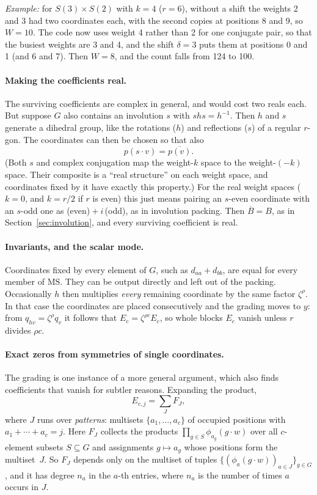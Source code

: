 \documentclass[11pt]{article}
\theoremstyle{definition}
\theoremstyle{remark}
\newcommand{\MS}{\mathrm{MS}}
\begin{document}
\emph{Example:} for $S(3)\times S(2)$ with $k = 4$ ($r = 6$), without a
shift the weights 2 and 3 had two coordinates each, with the second copies at
positions 8 and 9, so $W = 10$. The code now uses weight 4 rather than 2 for
one conjugate pair, so that the busiest weights are 3 and 4, and the shift
$\delta = 3$ puts them at positions 0 and 1 (and 6 and 7). Then $W = 8$, and
the count falls from 124 to 100.

\paragraph{Making the coefficients real.}
The surviving coefficients are complex in general, and would cost two reals
each. But suppose $G$ also contains an involution $s$ with $s h s = h^{-1}$.
Then $h$ and $s$ generate a dihedral group, like the rotations ($h$) and
reflections ($s$) of a regular $r$-gon. The coordinates can then be chosen so
that also
\[
  p(s \cdot v) = \overline{p(v)} .
\]
(Both $s$ and complex conjugation map the weight-$k$ space to the weight-$(-k)$
space. Their composite is a ``real structure'' on each weight space, and
coordinates fixed by it have exactly this property.) For the real weight
spaces ($k = 0$, and $k = r/2$ if $r$ is even) this just means pairing an
$s$-even coordinate with an $s$-odd one as (even)${}+i\,$(odd), as in involution
packing. Then $\overline{B} = B$, as in Section~\ref{sec:involution}, and every
surviving coefficient is real.

\paragraph{Invariants, and the scalar mode.}
Coordinates fixed by every element of $G$, such as $d_{aa} + d_{bb}$, are equal
for every member of $\MS$. They can be output directly and left out of the
packing. Occasionally $h$ then multiplies \emph{every} remaining coordinate by
the same factor $\zeta^\rho$. In that case the coordinates are placed
consecutively and the grading moves to $y$: from $q_{hv} = \zeta^\rho q_v$ it
follows that $E_c = \zeta^{\rho c} E_c$, so whole blocks $E_c$ vanish unless $r$
divides $\rho c$.

\paragraph{Exact zeros from symmetries of single coordinates.}
The grading is one instance of a more general argument, which also finds
coefficients that vanish for subtler reasons. Expanding the product,
\[
  E_{c,j} = \sum_{J} F_J ,
\]
where $J$ runs over \emph{patterns}: multisets $\{a_1, \ldots, a_c\}$ of
occupied positions with $a_1 + \cdots + a_c = j$. Here $F_J$ collects the
products $\prod_{g \in S} \phi_{a_g}(g \cdot w)$ over all $c$-element subsets
$S \subseteq G$ and assignments $g \mapsto a_g$ whose positions form the
multiset~$J$. So $F_J$ depends only on the multiset of tuples
$\{(\phi_a(g \cdot w))_{a \in J}\}_{g \in G}$, and it has degree $n_a$ in the
$a$-th entries, where $n_a$ is the number of times $a$ occurs in $J$.
\end{document}
